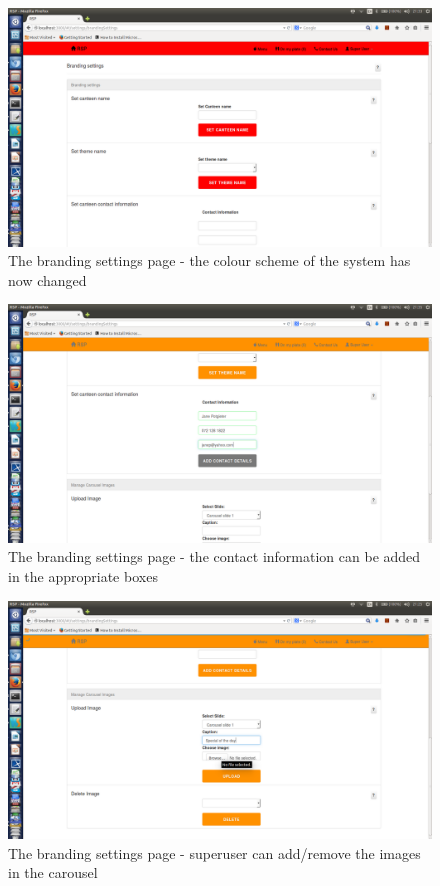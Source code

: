 \documentclass[a4paper,12pt]{report}
\begin{document}
\begin{figure}[H]
  \centering
    \includegraphics[width=1.0\textwidth]{screenshots/setTheme2.png}
    \caption{The branding settings page - the colour scheme of the system has now changed}
\end{figure}

\begin{figure}[H]
  \centering
    \includegraphics[width=1.0\textwidth]{screenshots/addContactInfo.png}
    \caption{The branding settings page - the contact information can be added in the appropriate boxes}
\end{figure}

\begin{figure}[H]
  \centering
    \includegraphics[width=1.0\textwidth]{screenshots/coverImage.png}
    \caption{The branding settings page - superuser can add/remove the images in the carousel} 
\end{figure}
\end{document}
